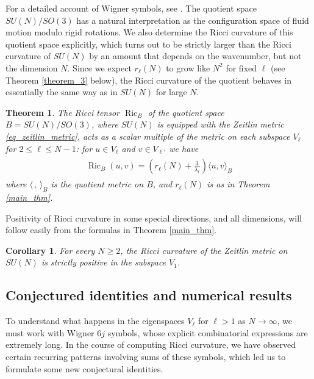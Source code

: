 \documentclass[11pt]{amsart}
\numberwithin{equation}{section}
\newtheorem{theorem}{Theorem}
\newtheorem{corollary}{Corollary}
\theoremstyle{definition}
\DeclareMathOperator{\Ric}{Ric}
\begin{document}
For a detailed account of Wigner symbols, see \cite{Varshalovich1988quantum}. The quotient space $SU(N)/SO(3)$ has a natural interpretation as the configuration space of fluid motion modulo rigid rotations. We also determine the Ricci curvature of this quotient space explicitly, which turns out to be strictly larger than the Ricci curvature of $SU(N)$ by an amount that depends on the wavenumber, but not the dimension $N$. Since we expect $r_{\ell}(N)$ to grow like $N^2$ for fixed $\ell$ (see Theorem \ref{theorem_3} below), the Ricci curvature of the quotient behaves in essentially the same way as in $SU(N)$ for large $N$.

\begin{theorem}\label{homogeneous_space_thm}
The Ricci tensor $\Ric_B$ of the quotient space $B = SU(N)/SO(3)$, where $SU(N)$ is equipped with the Zeitlin metric \eqref{eq_zeitlin_metric}, acts as a scalar multiple of the metric on each subspace $V_{\ell}$ for $2 \leq \ell \leq N-1$: for $u \in V_{\ell}$ and $v \in V_{\ell'}$ we have 
\begin{gather}
\begin{split}
\Ric_B(u, v) =  
\left(r_{\ell}(N) + \frac{3}{\lambda_{\ell}}\right)\langle u, v \rangle_B
\end{split}
\end{gather}
where $\langle \,,\,\rangle_B$ is the quotient metric on $B$, and $r_{\ell}(N)$ is as in Theorem \ref{main_thm}.
\end{theorem}


Positivity of Ricci curvature in some special directions, and all dimensions, will follow easily from the formulas in Theorem \ref{main_thm}. 

\begin{corollary}\label{positive_v1_corollary}
For every $N \geq 2$, the Ricci curvature of the Zeitlin metric on $SU(N)$ is strictly positive in the subspace $V_1$.
\end{corollary}

\subsection{Conjectured identities and numerical results}

To understand what happens in the eigenspaces $V_{\ell}$ for $\ell > 1$ as $N \rightarrow \infty$, we must work with Wigner $6j$ symbols, whose explicit combinatorial expressions are extremely long. In the course of computing Ricci curvature, we have observed certain recurring patterns involving sums of these symbols, which led us to formulate some new conjectural identities. 
\end{document}
